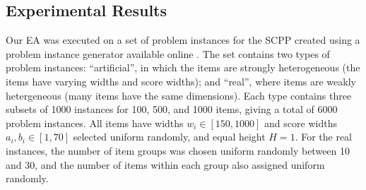 \documentclass[authoryear]{elsarticle}
\begin{document}
\begin{comment}
{\color{myRed}
\begin{itemize}[leftmargin=*]
	\item Fitness function by Falkenauer
	\item If $|\mathcal{S}_1| < |\mathcal{S}_2|$  then $f(\mathcal{S}_1) > f(\mathcal{S}_2)$, hence a global optimum for this fitness function is associated with the optimal solution containing the fewest number of bins.
	\item This is using the characteristic of the classical 1D BPP, where at most one bin in a solution is less than half full, as the contents of two half-full bins can be combined into one.
	\item However, solutions to the SCPP can contain multiple bins that are less than half-full, as the items within these bins may not be able to form a feasible alignment/packing due to the vsc.
	\item Many instances where although $|\mathcal{S}_1| < |\mathcal{S}_2|$, we have $f(\mathcal{S}_1) < f(\mathcal{S}_2)$.
	\item Thus we cannot rely on the fitness functionalone to guide us towards an optimal solution.
	\item Instead, we use the number of bins to compare the solutions, only using the fitness function when comparing two solutions of the same size to determine which solution has the better packing.
	\item Iterative procedure, plus local search and xover, swapping items between bins, better than previous heuristics as repetition means more possible item combinations in bins, EA has the ability to move items between bins.
	\item EA consists of multiple iterations, previous heuristics only one.
\end{itemize}
}
\end{comment}

\subsection{Experimental Results}
\label{sub:expea}
\noindent Our EA was executed on a set of problem instances for the SCPP created using a problem instance generator available online \citep{hawa2019}. The set contains two types of problem instances: ``artificial'', in which the items are strongly heterogeneous (the items have varying widths and score widths); and ``real'', where items are weakly hetergeneous (many items have the same dimensions). Each type contains three subsets of 1000 instances for 100, 500, and 1000 items, giving a total of 6000 problem instances. All items have widths $w_i \in [150,1000]$ and score widths $a_i, b_i \in [1,70]$ selected uniform randomly, and equal height $H=1$. For the real instances, the number of item groups was chosen uniform randomly between 10 and 30, and the number of items within each group also assigned uniform randomly.
\end{document}
